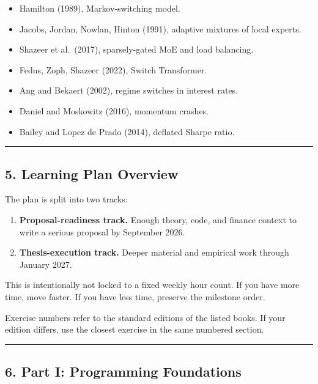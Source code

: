 \begin{itemize}
\tightlist
\item
  Hamilton (1989), Markov-switching model.
\item
  Jacobs, Jordan, Nowlan, Hinton (1991), adaptive mixtures of local
  experts.
\item
  Shazeer et al.~(2017), sparsely-gated MoE and load balancing.
\item
  Fedus, Zoph, Shazeer (2022), Switch Transformer.
\item
  Ang and Bekaert (2002), regime switches in interest rates.
\item
  Daniel and Moskowitz (2016), momentum crashes.
\item
  Bailey and Lopez de Prado (2014), deflated Sharpe ratio.
\end{itemize}

\begin{center}\rule{0.5\linewidth}{0.5pt}\end{center}

\subsection{5. Learning Plan Overview}\label{learning-plan-overview}

The plan is split into two tracks:

\begin{enumerate}
\def\labelenumi{\arabic{enumi}.}
\tightlist
\item
  \textbf{Proposal-readiness track.} Enough theory, code, and finance
  context to write a serious proposal by September 2026.
\item
  \textbf{Thesis-execution track.} Deeper material and empirical work
  through January 2027.
\end{enumerate}

This is intentionally not locked to a fixed weekly hour count. If you
have more time, move faster. If you have less time, preserve the
milestone order.

Exercise numbers refer to the standard editions of the listed books. If
your edition differs, use the closest exercise in the same numbered
section.

\begin{center}\rule{0.5\linewidth}{0.5pt}\end{center}

\subsection{6. Part I: Programming
Foundations}\label{part-i-programming-foundations}

